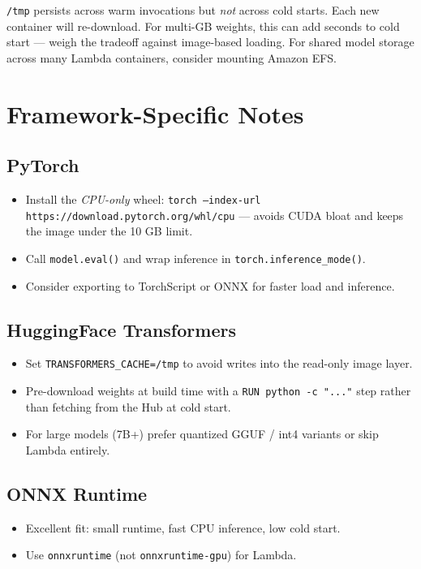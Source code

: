 \documentclass[11pt,a4paper]{article}
\begin{document}
\begin{notebox}
\texttt{/tmp} persists across warm invocations but \emph{not} across cold
starts. Each new container will re-download. For multi-GB weights, this can
add seconds to cold start --- weigh the tradeoff against image-based loading.
For shared model storage across many Lambda containers, consider mounting
Amazon EFS.
\end{notebox}

\section{Framework-Specific Notes}

\subsection{PyTorch}
\begin{itemize}[leftmargin=*,nosep]
    \item Install the \emph{CPU-only} wheel: \texttt{torch --index-url
          https://download.pytorch.org/whl/cpu} --- avoids CUDA bloat and
          keeps the image under the 10 GB limit.
    \item Call \texttt{model.eval()} and wrap inference in
          \texttt{torch.inference\_mode()}.
    \item Consider exporting to TorchScript or ONNX for faster load and
          inference.
\end{itemize}

\subsection{HuggingFace Transformers}
\begin{itemize}[leftmargin=*,nosep]
    \item Set \texttt{TRANSFORMERS\_CACHE=/tmp} to avoid writes into the
          read-only image layer.
    \item Pre-download weights at build time with a \texttt{RUN python -c
          "..."} step rather than fetching from the Hub at cold start.
    \item For large models (7B+) prefer quantized GGUF / int4 variants or
          skip Lambda entirely.
\end{itemize}

\subsection{ONNX Runtime}
\begin{itemize}[leftmargin=*,nosep]
    \item Excellent fit: small runtime, fast CPU inference, low cold start.
    \item Use \texttt{onnxruntime} (not \texttt{onnxruntime-gpu}) for Lambda.
\end{itemize}
\end{document}
